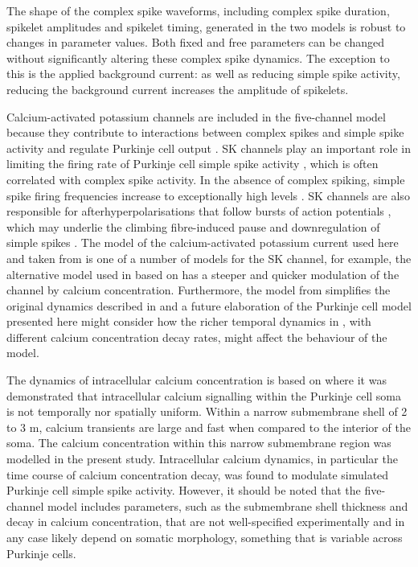 \documentclass[utf8]{frontiersSCNS} %
\begin{document}
The shape of the complex spike waveforms, including complex spike
duration, spikelet amplitudes and spikelet timing, generated in the
two models is robust to changes in parameter values. Both fixed and
free parameters can be changed without significantly altering these
complex spike dynamics. The exception to this is the applied
background current: as well as reducing simple spike activity,
reducing the background current increases the amplitude of spikelets.

Calcium-activated potassium channels are included in the five-channel
model because they contribute to interactions between complex spikes
and simple spike activity and regulate Purkinje cell output
\cite{TankEtAl1988, McKayEtAl2007}. SK channels play an important role
in limiting the firing rate of Purkinje cell simple spike activity
\cite{WomackEtAl2003} \cite{EgorovaEtAl2014}, which is often
correlated with complex spike activity. In the absence of complex
spiking, simple spike firing frequencies increase to exceptionally
high levels \cite{CerminaraRawson2004}. SK channels are also
responsible for afterhyperpolarisations that follow bursts of action
potentials \cite{HosyEtAl2011}, which may underlie the climbing
fibre-induced pause and downregulation of simple spikes
\cite{Xian-HuaEtAl2017}. The model of the calcium-activated potassium
current used here and taken from \cite{GilliesWillshaw2006} is one of
a number of models for the SK channel, for example, the alternative
model used in \cite{GriffithEtAl2016} based on
\cite{ChayKeizer1983,XiaEtAl1998} has a steeper and quicker modulation
of the channel by calcium concentration. Furthermore, the model from
\cite{GilliesWillshaw2006} simplifies the original dynamics described
in \cite{HirschbergEtAl1998} and a future elaboration of the Purkinje
cell model presented here might consider how the richer temporal
dynamics in \cite{HirschbergEtAl1998}, with different calcium
concentration decay rates, might affect the behaviour of the model.

The dynamics of intracellular calcium concentration is based on
\cite{EilersEtAl1995} where it was demonstrated that intracellular
calcium signalling within the Purkinje cell soma is not temporally nor
spatially uniform. Within a narrow submembrane shell of 2 to 3 \textmu
m, calcium transients are large and fast when compared to the interior
of the soma. The calcium concentration within this narrow submembrane
region was modelled in the present study. Intracellular calcium
dynamics, in particular the time course of calcium concentration
decay, was found to modulate simulated Purkinje cell simple spike
activity. However, it should be noted that the five-channel model
includes parameters, such as the submembrane shell thickness and decay
in calcium concentration, that are not well-specified experimentally
and in any case likely depend on somatic morphology, something that is
variable across Purkinje cells.
\end{document}
